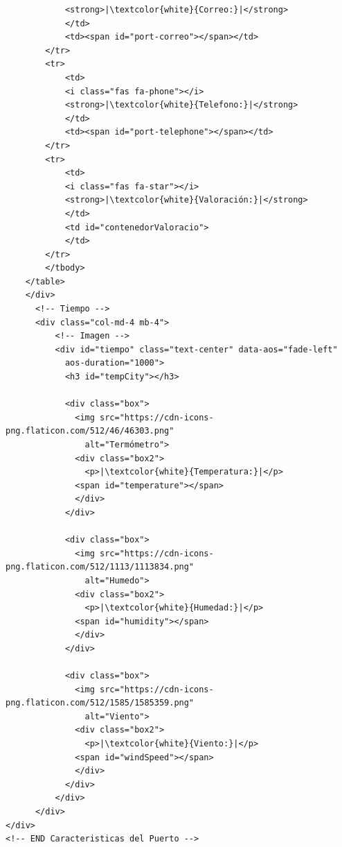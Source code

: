 \documentclass{article}
\begin{document}
\begin{verbatim}
            <strong>|\textcolor{white}{Correo:}|</strong>
            </td>
            <td><span id="port-correo"></span></td>
        </tr>
        <tr>
            <td>
            <i class="fas fa-phone"></i>
            <strong>|\textcolor{white}{Telefono:}|</strong>
            </td>
            <td><span id="port-telephone"></span></td>
        </tr>
        <tr>
            <td>
            <i class="fas fa-star"></i>
            <strong>|\textcolor{white}{Valoración:}|</strong>
            </td>
            <td id="contenedorValoracio">
            </td>
        </tr>
        </tbody>
    </table>
    </div>
      <!-- Tiempo -->
      <div class="col-md-4 mb-4">
          <!-- Imagen -->
          <div id="tiempo" class="text-center" data-aos="fade-left" 
            aos-duration="1000">
            <h3 id="tempCity"></h3>
        
            <div class="box">
              <img src="https://cdn-icons-png.flaticon.com/512/46/46303.png" 
                alt="Termómetro">
              <div class="box2">
                <p>|\textcolor{white}{Temperatura:}|</p>
              <span id="temperature"></span>
              </div>
            </div>
        
            <div class="box">
              <img src="https://cdn-icons-png.flaticon.com/512/1113/1113834.png" 
                alt="Humedo">
              <div class="box2">
                <p>|\textcolor{white}{Humedad:}|</p>
              <span id="humidity"></span>
              </div>
            </div>
        
            <div class="box">
              <img src="https://cdn-icons-png.flaticon.com/512/1585/1585359.png" 
                alt="Viento">
              <div class="box2">
                <p>|\textcolor{white}{Viento:}|</p>
              <span id="windSpeed"></span>
              </div>
            </div>
          </div>
      </div>
</div>
<!-- END Caracteristicas del Puerto -->
\end{verbatim}
\end{document}
